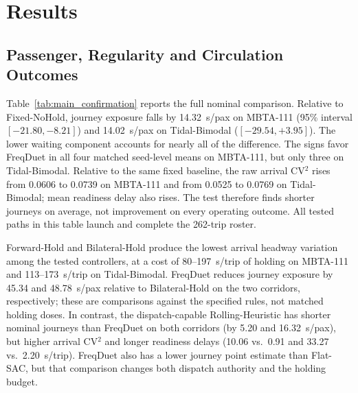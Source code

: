 





\section{Results}
\label{sec:results}

\subsection{Passenger, Regularity and Circulation Outcomes}
\label{sec:results_main}

Table~\ref{tab:main_confirmation} reports the full nominal comparison. Relative to Fixed-NoHold, journey exposure falls by 14.32~s/pax on MBTA-111 (95\% interval $[-21.80,-8.21]$) and 14.02~s/pax on Tidal-Bimodal ($[-29.54,+3.95]$). The lower waiting component accounts for nearly all of the difference. The signs favor FreqDuet in all four matched seed-level means on MBTA-111, but only three on Tidal-Bimodal. Relative to the same fixed baseline, the raw arrival CV$^2$ rises from 0.0606 to 0.0739 on MBTA-111 and from 0.0525 to 0.0769 on Tidal-Bimodal; mean readiness delay also rises. The test therefore finds shorter journeys on average, not improvement on every operating outcome. All tested paths in this table launch and complete the 262-trip roster.

\begin{table}[!ht]
\centering
\caption{Nominal confirmation on 16 paired simulated days per corridor. Learned policy means and between-seed SDs use four training seeds; the deterministic rules have zero training SD. $\Delta J$ is FreqDuet minus the indicated comparator, with pointwise paired seed-by-day bootstrap intervals. Time measures are seconds; passenger and trip denominators are shown where applicable.}
\label{tab:main_confirmation}
\end{table}

Forward-Hold and Bilateral-Hold produce the lowest arrival headway variation among the tested controllers, at a cost of 80--197~s/trip of holding on MBTA-111 and 113--173~s/trip on Tidal-Bimodal. FreqDuet reduces journey exposure by 45.34 and 48.78~s/pax relative to Bilateral-Hold on the two corridors, respectively; these are comparisons against the specified rules, not matched holding doses. In contrast, the dispatch-capable Rolling-Heuristic has shorter nominal journeys than FreqDuet on both corridors (by 5.20 and 16.32~s/pax), but higher arrival CV$^2$ and longer readiness delays (10.06 vs.\ 0.91 and 33.27 vs.\ 2.20~s/trip). FreqDuet also has a lower journey point estimate than Flat-SAC, but that comparison changes both dispatch authority and the holding budget.


